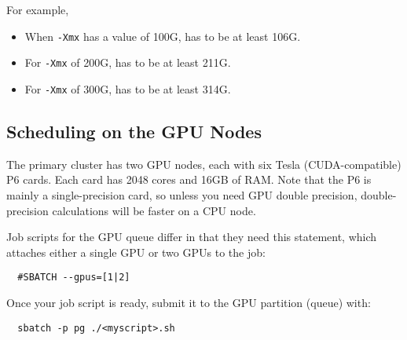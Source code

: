 For example, 
\begin{itemize}
  \item When \texttt{-Xmx} has a value of 100G,  has to be at least 106G.
  \item For \texttt{-Xmx} of 200G,  has to be at least 211G.
  \item For \texttt{-Xmx} of 300G,  has to be at least 314G.
\end{itemize}


\subsection{Scheduling on the GPU Nodes}

The primary cluster has two GPU nodes, each with six Tesla (CUDA-compatible) P6
cards. Each card has 2048 cores and 16GB of RAM. Note that the P6
is mainly a single-precision card, so unless you need GPU double precision, 
double-precision calculations will be faster on a CPU node.

\noindent Job scripts for the GPU queue differ in that they need this statement,
which attaches either a single GPU or two GPUs to the job:
\begin{verbatim}
  #SBATCH --gpus=[1|2]
\end{verbatim}




\noindent Once your job script is ready, submit it to the GPU partition (queue) with:
\begin{verbatim}
  sbatch -p pg ./<myscript>.sh
\end{verbatim}

